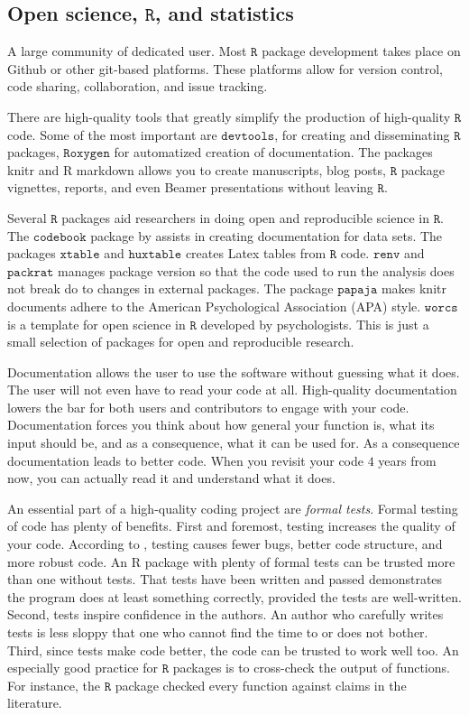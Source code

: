 \subsection{Open science, $\mathtt{R}$, and statistics}

A large community of dedicated user. Most $\mathtt{R}$ package development
takes place on Github or other git-based platforms. These platforms
allow for version control, code sharing, collaboration, and issue
tracking. 

There are high-quality tools that greatly simplify the production
of high-quality $\mathtt{R}$ code. Some of the most important are
$\texttt{devtools}$, for creating and disseminating $\mathtt{R}$
packages, $\mathtt{Roxygen}$ for automatized creation of documentation.
The packages knitr and R markdown allows you to create manuscripts,
blog posts, $\mathtt{R}$ package vignettes, reports, and even Beamer
presentations without leaving $\mathtt{R}$.

Several $\mathtt{R}$ packages aid researchers in doing open and reproducible
science in $\mathtt{R}$. The $\texttt{codebook}$ package by \cite{Arslan2019-tg}
assists in creating documentation for data sets. The packages $\texttt{xtable}$
and $\texttt{huxtable}$ creates Latex tables from $\mathtt{R}$ code.
$\texttt{renv}$ and $\texttt{packrat}$ manages package version so
that the code used to run the analysis does not break do to changes
in external packages. The package $\texttt{papaja}$ makes knitr documents
adhere to the American Psychological Association (APA) style. $\mathtt{worcs}$
\parencite{Van_Lissa2020-sb} is a template for open science in $\mathtt{R}$
developed by psychologists. This is just a small selection of packages
for open and reproducible research.

Documentation allows the user to use the software without guessing
what it does. The user will not even have to read your code at all.
High-quality documentation lowers the bar for both users and contributors
to engage with your code. Documentation forces you think about how
general your function is, what its input should be, and as a consequence,
what it can be used for. As a consequence documentation leads to better
code. When you revisit your code $4$ years from now, you can actually
read it and understand what it does. 

An essential part of a high-quality coding project are \emph{formal
tests}. Formal testing of code has plenty of benefits. First and foremost,
testing increases the quality of your code. According to \cite[Chapter 7]{Wickham2015-ik},
testing causes fewer bugs, better code structure, and more robust
code. An R package with plenty of formal tests can be trusted more
than one without tests. That tests have been written and passed demonstrates
the program does at least something correctly, provided the tests
are well-written. Second, tests inspire confidence in the authors.
An author who carefully writes tests is less sloppy that one who cannot
find the time to or does not bother. Third, since tests make code
better, the code can be trusted to work well too. An especially good
practice for $\mathtt{R}$ packages is to cross-check the output of
functions. For instance, the $\mathtt{R}$ package checked every function
against claims in the literature. 

